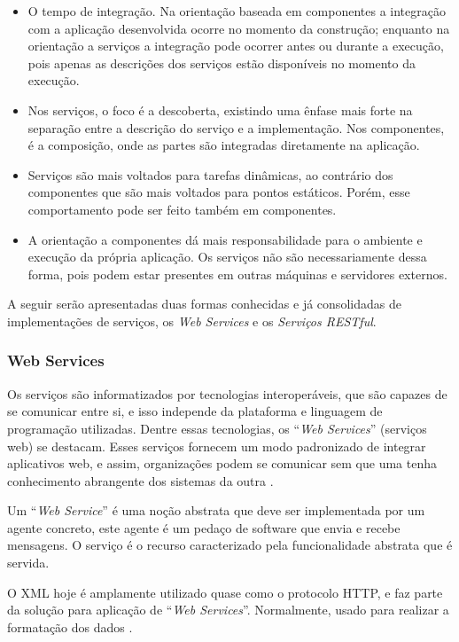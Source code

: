 \begin{itemize}
	\item O tempo de integração. Na orientação baseada em componentes a integração com a aplicação desenvolvida ocorre no momento da construção; enquanto na orientação a serviços a integração pode ocorrer antes ou durante a execução, pois apenas as descrições dos serviços estão disponíveis no momento da execução.
	\item Nos serviços, o foco é a descoberta, existindo uma ênfase mais forte na separação entre a descrição do serviço e a implementação. Nos componentes, é a composição, onde as partes são integradas diretamente na aplicação.
	\item Serviços são mais voltados para tarefas dinâmicas, ao contrário dos componentes que são mais voltados para pontos estáticos. Porém, esse comportamento pode ser feito também em componentes.
	\item A orientação a componentes dá mais responsabilidade para o ambiente e execução da própria aplicação. Os serviços não são necessariamente dessa forma, pois podem estar presentes em outras máquinas e servidores externos.
\end{itemize}

A seguir serão apresentadas duas formas conhecidas e já consolidadas de implementações de serviços, os \textit{Web Services} e os \textit{Serviços RESTful}.

\subsubsection{Web Services}

Os serviços são informatizados por tecnologias interoperáveis, que são capazes de se comunicar entre si, e isso independe da plataforma e linguagem de programação utilizadas. Dentre essas tecnologias, os ``\textit{Web Services}'' (serviços web) se destacam. Esses serviços fornecem um modo padronizado de integrar aplicativos web, e assim, organizações podem se comunicar sem que uma tenha conhecimento abrangente dos sistemas da outra \cite{Victorino:Brascher:2009}.

Um ``\textit{Web Service}'' é uma noção abstrata que deve ser implementada por um agente concreto, este agente é um pedaço de software que envia e recebe mensagens. O serviço é o recurso caracterizado pela funcionalidade abstrata que é servida.

O XML hoje é amplamente utilizado quase como o protocolo HTTP, e faz parte da solução para aplicação de ``\textit{Web Services}''. Normalmente, usado para realizar a formatação dos dados \cite{Alonso:Casati:Kuno:Machiraju:2010}.

